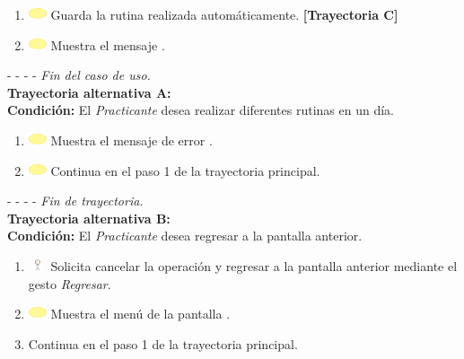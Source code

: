 \begin{enumerate}
	\item \includegraphics[width=15pt]{./Figuras/iconosCU/herramienta.png} Guarda la rutina realizada automáticamente. \textbf{[Trayectoria C]}
	\item \includegraphics[width=15pt]{./Figuras/iconosCU/herramienta.png} Muestra el mensaje .
\end{enumerate}
	
- - - - \textit{Fin del caso de uso.} \\

\textbf{\large{Trayectoria alternativa A:}}\\
\textbf{Condición: } El \textit{Practicante} desea realizar diferentes rutinas en un día. 

\begin{enumerate}
	\item \includegraphics[width=15pt]{./Figuras/iconosCU/herramienta.png} Muestra el mensaje de error .
	\item \includegraphics[width=15pt]{./Figuras/iconosCU/herramienta.png} Continua en el paso 1 de la trayectoria principal.
\end{enumerate}

- - - - \textit{Fin de trayectoria.} \\

\textbf{\large{Trayectoria alternativa B:}}\\
\textbf{Condición: } El \textit{Practicante} desea regresar a la pantalla anterior.

\begin{enumerate}
	\item \includegraphics[width=15pt, height=10pt]{./Figuras/iconosCU/usuario.png} Solicita cancelar la operación y regresar a la pantalla anterior mediante el gesto \textit{Regresar}.
	\item \includegraphics[width=15pt]{./Figuras/iconosCU/herramienta.png} Muestra el menú de la pantalla .
	\item  Continua en el paso 1 de la trayectoria principal.
\end{enumerate}

